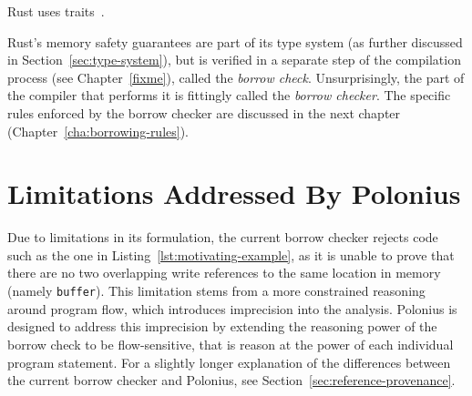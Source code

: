 \documentclass[11pt,a4paper,twoside,openany]{report}
\newcommand{\fixme}[1] {{\color{red}#1}}
\newcommand{\InRust}[1]{\texttt{#1}}
\begin{document}


\fixme{Rust uses traits~\cite{scharli2003traits}.}


Rust's memory safety guarantees are part of its type system (as further
discussed in Section~\ref{sec:type-system}), but is verified in a separate step
of the compilation process (see Chapter~\ref{fixme}), called the \textit{borrow
  check}. Unsurprisingly, the part of the compiler that performs it is fittingly
called the \textit{borrow checker}. The specific rules enforced by the borrow
checker are discussed in the next chapter (Chapter~\ref{cha:borrowing-rules}).

\section{Limitations Addressed By Polonius}\label{sec:limitations}

Due to limitations in its formulation, the current borrow checker rejects code
such as the one in Listing~\ref{lst:motivating-example}, as it is unable to
prove that there are no two overlapping write references to the same location in
memory (namely \InRust{buffer}). This limitation stems from a more constrained
reasoning around program flow, which introduces imprecision into the analysis.
Polonius is designed to address this imprecision by extending the reasoning
power of the borrow check to be flow-sensitive, that is reason at the power of
each individual program statement. For a slightly longer explanation of the
differences between the current borrow checker and Polonius, see
Section~\ref{sec:reference-provenance}.
\end{document}
